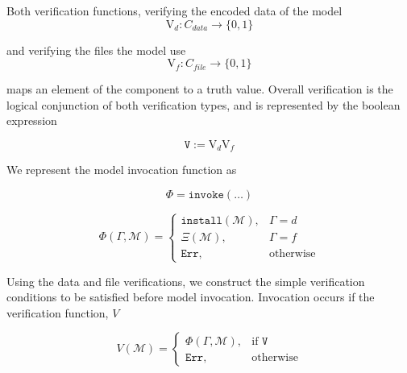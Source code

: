 \documentclass[10pt, titlepage, twocolumn]{article}
\begin{document}
Both verification functions, verifying the encoded data of the model
\begin{equation}
\text{V}_d : C _{data} \rightarrow \{0,1\}  
\end{equation}

and verifying the files the model use
\begin{equation}
\text{V}_f : C_{file} \rightarrow \{0,1\}  
\end{equation}

maps an element of the component to a truth value. Overall verification is the logical conjunction of both verification types, and is represented by the boolean expression

\begin{equation}
\texttt{V} := \text{V}_d\text{V}_f
\end{equation}

We represent the model invocation function as

\begin{equation}
\Phi = \texttt{invoke}(\dots)
\end{equation}



\begin{equation}
    \Phi( \Gamma,  \boldsymbol{\mathcal{M}} ) = 
\begin{cases}

    \texttt{install}( \boldsymbol{\mathcal{M}} ),		   
    & \Gamma = d\\
    
    \Xi ( \boldsymbol{\mathcal{M}} ),		   
    & \Gamma = f\\
    
    \texttt{Err},              							   
    & \text{otherwise}
    
\end{cases}
\end{equation}

Using the data and file verifications, we construct the simple verification conditions to be satisfied before model invocation. Invocation occurs if the verification function, \(V\)

\begin{equation}
    V( \boldsymbol{\mathcal{M}} ) = 
\begin{cases}

    \Phi( \Gamma, \boldsymbol{\mathcal{M}} ),		   
    & \text{if } \texttt{V}\\
    
    \texttt{Err},              							   
    & \text{otherwise}
    
\end{cases}
\end{equation}
\end{document}
